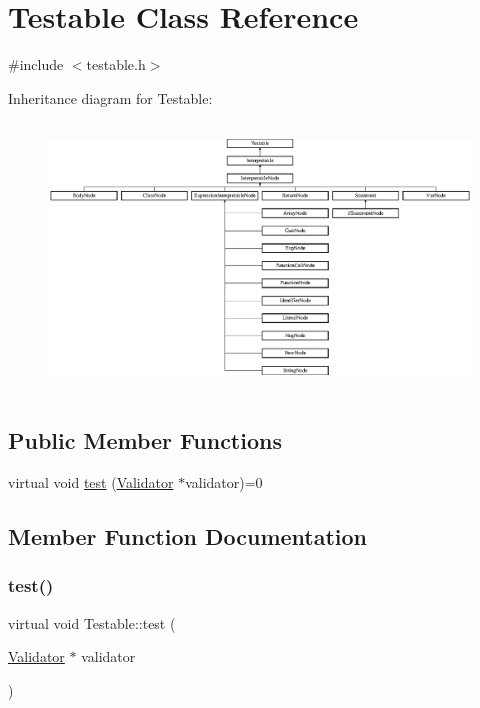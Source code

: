 \hypertarget{classTestable}{}\section{Testable Class Reference}
\label{classTestable}


{\ttfamily \#include $<$testable.\+h$>$}

Inheritance diagram for Testable\+:\begin{figure}[H]
\begin{center}
\leavevmode
\includegraphics[height=7.140255cm]{classTestable}
\end{center}
\end{figure}
\subsection*{Public Member Functions}
\begin{DoxyCompactItemize}
\item 
virtual void \hyperlink{classTestable_aa10ae4ed84c5d9b36bd69be37790e6ba}{test} (\hyperlink{classValidator}{Validator} $\ast$validator)=0
\end{DoxyCompactItemize}


\subsection{Member Function Documentation}
\mbox{\label{classTestable_aa10ae4ed84c5d9b36bd69be37790e6ba}} 
\subsubsection{\texorpdfstring{test()}{test()}}
{\footnotesize\ttfamily virtual void Testable\+::test (\begin{DoxyParamCaption}\item[{\hyperlink{classValidator}{Validator} $\ast$}]{validator }\end{DoxyParamCaption})\hspace{0.3cm}{\ttfamily [pure virtual]}}



